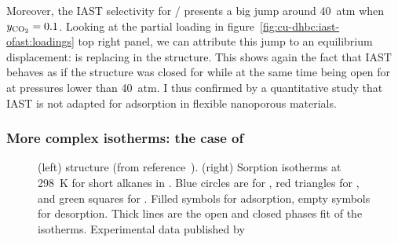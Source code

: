 \documentclass[thesis]{subfiles}
\begin{document}
Moreover, the IAST selectivity for / presents a big jump around
\SI{40}{atm} when $y_{\ce{CO2}} = 0.1$. Looking at the partial loading in
figure~\ref{fig:cu-dhbc:iast-ofast:loadings} top right panel, we can attribute
this jump to an equilibrium displacement:  is replacing  in the
structure. This shows again the fact that IAST behaves as if the structure was
closed for  while at the same time being open for  at pressures
lower than \SI{40}{atm}. I thus confirmed by a quantitative study that IAST is
not adapted for adsorption in flexible nanoporous materials.

\FloatBarrier
\subsubsection{More complex isotherms: the case of \RPMZn}

\begin{figure}[htp]
    \centering
    \hfill
    \raisebox{-0.5\height}{}
    \caption{(left) \RPMZn structure (from reference~\cite{Lan2009-2}).
    (right) Sorption isotherms at \SI{298}{K} for short
    alkanes in \RPMZn. Blue circles are for , red triangles for
    , and green squares for . Filled symbols for adsorption,
    empty symbols for desorption. Thick lines are the open and closed phases fit
    of the isotherms. Experimental data published by
    \citeauthor{Nijem2012}\cite{Nijem2012}}
    \label{fig:rpm3-zn}
\end{figure}
\end{document}
